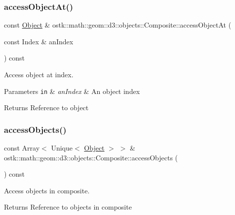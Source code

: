 \subsubsection{\texorpdfstring{access\+Object\+At()}{accessObjectAt()}}
{\footnotesize\ttfamily const \hyperlink{classostk_1_1math_1_1geom_1_1d3_1_1_object}{Object} \& ostk\+::math\+::geom\+::d3\+::objects\+::\+Composite\+::access\+Object\+At (\begin{DoxyParamCaption}\item[{const Index \&}]{an\+Index }\end{DoxyParamCaption}) const}



Access object at index. 


\begin{DoxyParams}[1]{Parameters}
\mbox{\tt in}  & {\em an\+Index} & An object index \\
\hline
\end{DoxyParams}
\begin{DoxyReturn}{Returns}
Reference to object 
\end{DoxyReturn}
\mbox{\label{classostk_1_1math_1_1geom_1_1d3_1_1objects_1_1_composite_a88392e0fefef248703057a22d17b90af}} 
\subsubsection{\texorpdfstring{access\+Objects()}{accessObjects()}}
{\footnotesize\ttfamily const Array$<$ Unique$<$ \hyperlink{classostk_1_1math_1_1geom_1_1d3_1_1_object}{Object} $>$ $>$ \& ostk\+::math\+::geom\+::d3\+::objects\+::\+Composite\+::access\+Objects (\begin{DoxyParamCaption}{ }\end{DoxyParamCaption}) const}



Access objects in composite. 

\begin{DoxyReturn}{Returns}
Reference to objects in composite 
\end{DoxyReturn}
\mbox{\label{classostk_1_1math_1_1geom_1_1d3_1_1objects_1_1_composite_a2d99d6b4096c2f5ba3175f886e2e2c7d}} 
